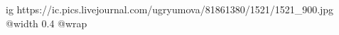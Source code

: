  
 
 
 
 

\ifcmt
  ig https://ic.pics.livejournal.com/ugryumova/81861380/1521/1521_900.jpg
  @width 0.4
  @wrap 
\fi

